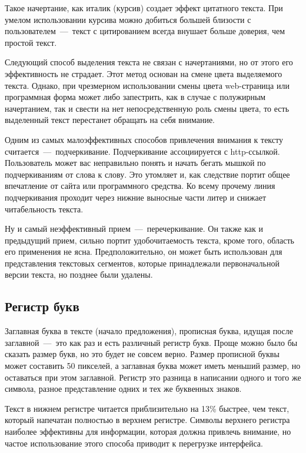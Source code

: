 \documentclass[14pt]{extarticle}
\begin{document}
Такое начертание, как италик (курсив) создает эффект цитатного текста. При умелом использовании курсива можно добиться большей близости с пользователем~---~текст с цитированием всегда внушает больше доверия, чем простой текст.

Следующий способ выделения текста не связан с начертаниями, но от этого его эффективность не страдает. Этот метод основан на смене цвета выделяемого текста. Однако, при чрезмерном использовании смены цвета web-страница или программная форма может либо запестрить, как в случае с полужирным начертанием, так и свести на нет непосредственную роль смены цвета, то есть выделенный текст перестанет обращать на себя внимание.

Одним из самых малоэффективных способов привлечения внимания к тексту считается~---~подчеркивание. Подчеркивание ассоциируется с http-ссылкой. Пользователь может вас неправильно понять и начать бегать мышкой по подчеркиваниям от слова к слову. Это утомляет и, как следствие портит общее впечатление от сайта или программного средства. Ко всему прочему линия подчеркивания проходит через нижние выносные части литер и снижает читабельность текста.

Ну и самый неэффективный прием~---~перечеркивание. Он также как и предыдущий прием, сильно портит удобочитаемость текста, кроме того, область его применения не ясна. Предположительно, он может быть использован для представления текстовых сегментов, которые принадлежали первоначальной версии текста, но позднее были удалены.

\subsection{Регистр букв}

Заглавная буква в тексте (начало предложения), прописная буква, идущая после заглавной~---~это как раз и есть различный регистр букв. Проще можно было бы сказать размер букв, но это будет не совсем верно. Размер прописной буквы может составить 50 пикселей, а заглавная буква может иметь меньший размер, но оставаться при этом заглавной. Регистр это разница в написании одного и того же символа, разное представление одних и тех же буквенных знаков.

Текст в нижнем регистре читается приблизительно на 13\% быстрее, чем текст, который напечатан полностью в верхнем регистре. Символы верхнего регистра наиболее эффективны для информации, которая должна привлечь внимание, но частое использование этого способа приводит к перегрузке интерфейса.
\end{document}
